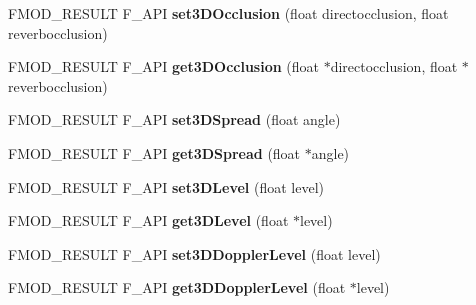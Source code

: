\begin{DoxyCompactItemize}
\item 
\hypertarget{class_f_m_o_d_1_1_channel_control_aec9d420c82b59c552ab46f53b99a92a4}{F\+M\+O\+D\+\_\+\+R\+E\+S\+U\+L\+T F\+\_\+\+A\+P\+I {\bfseries set3\+D\+Occlusion} (float directocclusion, float reverbocclusion)}\label{class_f_m_o_d_1_1_channel_control_aec9d420c82b59c552ab46f53b99a92a4}

\item 
\hypertarget{class_f_m_o_d_1_1_channel_control_ad4bfb501ccd002ccbb0d0925d4258ef8}{F\+M\+O\+D\+\_\+\+R\+E\+S\+U\+L\+T F\+\_\+\+A\+P\+I {\bfseries get3\+D\+Occlusion} (float $\ast$directocclusion, float $\ast$reverbocclusion)}\label{class_f_m_o_d_1_1_channel_control_ad4bfb501ccd002ccbb0d0925d4258ef8}

\item 
\hypertarget{class_f_m_o_d_1_1_channel_control_a12bba143567655a19886bdda772c60c6}{F\+M\+O\+D\+\_\+\+R\+E\+S\+U\+L\+T F\+\_\+\+A\+P\+I {\bfseries set3\+D\+Spread} (float angle)}\label{class_f_m_o_d_1_1_channel_control_a12bba143567655a19886bdda772c60c6}

\item 
\hypertarget{class_f_m_o_d_1_1_channel_control_a3b771f6762f3d472eda8d5e9e323f9c3}{F\+M\+O\+D\+\_\+\+R\+E\+S\+U\+L\+T F\+\_\+\+A\+P\+I {\bfseries get3\+D\+Spread} (float $\ast$angle)}\label{class_f_m_o_d_1_1_channel_control_a3b771f6762f3d472eda8d5e9e323f9c3}

\item 
\hypertarget{class_f_m_o_d_1_1_channel_control_a4ea9d36f487d6b0b41f1f9d64977c153}{F\+M\+O\+D\+\_\+\+R\+E\+S\+U\+L\+T F\+\_\+\+A\+P\+I {\bfseries set3\+D\+Level} (float level)}\label{class_f_m_o_d_1_1_channel_control_a4ea9d36f487d6b0b41f1f9d64977c153}

\item 
\hypertarget{class_f_m_o_d_1_1_channel_control_abeb7d638eb2599c22697eb1083a7cee7}{F\+M\+O\+D\+\_\+\+R\+E\+S\+U\+L\+T F\+\_\+\+A\+P\+I {\bfseries get3\+D\+Level} (float $\ast$level)}\label{class_f_m_o_d_1_1_channel_control_abeb7d638eb2599c22697eb1083a7cee7}

\item 
\hypertarget{class_f_m_o_d_1_1_channel_control_ac018af41cf8889e6ad76c7b9503e5300}{F\+M\+O\+D\+\_\+\+R\+E\+S\+U\+L\+T F\+\_\+\+A\+P\+I {\bfseries set3\+D\+Doppler\+Level} (float level)}\label{class_f_m_o_d_1_1_channel_control_ac018af41cf8889e6ad76c7b9503e5300}

\item 
\hypertarget{class_f_m_o_d_1_1_channel_control_a0b57ab9a75c712f06cde4cd83bb52401}{F\+M\+O\+D\+\_\+\+R\+E\+S\+U\+L\+T F\+\_\+\+A\+P\+I {\bfseries get3\+D\+Doppler\+Level} (float $\ast$level)}\label{class_f_m_o_d_1_1_channel_control_a0b57ab9a75c712f06cde4cd83bb52401}


\end{DoxyCompactItemize}
